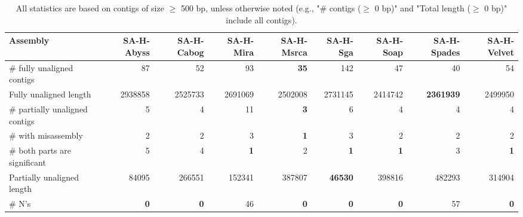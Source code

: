 \documentclass[12pt,a4paper]{article}
\begin{document}
\begin{table}[ht]
\begin{center}
\caption{All statistics are based on contigs of size $\geq$ 500 bp, unless otherwise noted (e.g., "\# contigs ($\geq$ 0 bp)" and "Total length ($\geq$ 0 bp)" include all contigs).}
\begin{tabular}{|l*{8}{|r}|}
\hline
Assembly & SA-H-Abyss & SA-H-Cabog & SA-H-Mira & SA-H-Msrca & SA-H-Sga & SA-H-Soap & SA-H-Spades & SA-H-Velvet \\ \hline
\# fully unaligned contigs & 87 & 52 & 93 & {\bf 35} & 142 & 47 & 40 & 54 \\ \hline
Fully unaligned length & 2938858 & 2525733 & 2691069 & 2502008 & 2731145 & 2414742 & {\bf 2361939} & 2499950 \\ \hline
\# partially unaligned contigs & 5 & 4 & 11 & {\bf 3} & 6 & 4 & 4 & 4 \\ \hline
\hspace{5mm}\# with misassembly & 2 & 2 & 3 & {\bf 1} & 3 & 2 & 2 & 2 \\ \hline
\hspace{5mm}\# both parts are significant & 5 & 4 & {\bf 1} & 2 & {\bf 1} & {\bf 1} & 3 & {\bf 1} \\ \hline
Partially unaligned length & 84095 & 266551 & 152341 & 387807 & {\bf 46530} & 398816 & 482293 & 314904 \\ \hline
\# N's & {\bf 0} & {\bf 0} & 46 & {\bf 0} & {\bf 0} & {\bf 0} & 57 & {\bf 0} \\ \hline
\end{tabular}
\end{center}
\end{table}
\end{document}
